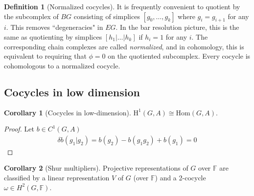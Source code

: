 \documentclass{article}
\theoremstyle{definition}
\newtheorem{defn}{Definition}
\theoremstyle{definition}
\newtheorem{cor}{Corollary}
\newcommand{\F}{\mathbb F}
\newcommand{\Hom}{\text{Hom}}
\newcommand{\cohom}{\mathrm H}
\begin{document}
\begin{defn}[Normalized cocycles\label{defn:normalized-cocycles}]
It is frequently convenient to quotient by the subcomplex of $BG$ consisting of
simplices $[g_0, \dots, g_k]$ where $g_i = g_{i+1}$  for any $i$. This removes
``degeneracies" in $EG$. In the bar resolution picture, this is the same as
quotienting by simplices $[h_1 | \ldots | h_k]$ if $h_i = 1$ for any $i$. The
corresponding chain complexes are called \textit{normalized}, and in cohomology,
this is equivalent to requiring that $\phi = 0$ on the quotiented subcomplex.
Every cocycle is cohomologous to a normalized cocycle.
\end{defn}

\subsection{Cocycles in low dimension}

\begin{cor}[Cocycles in low-dimension]\label{cor:h-1-homomorphisms} 
$\cohom^1(G, A) \cong \Hom(G, A)$. 
\end{cor}

\begin{proof}
Let $b \in C^1(G, A)$
\begin{align}
\delta b(g_1|g_2) = b(g_2) - b(g_1g_2) + b(g_1) = 0
\end{align}
\end{proof}

\begin{cor}[Shur multipliers]\label{cor:shur-multipliers}
Projective representations of $G$ over $\F$ are classified by a linear representation $V$ of $G$ (over $\F$) and a 2-cocycle $\omega \in H^2(G, \F)$.
\end{cor}
\end{document}

